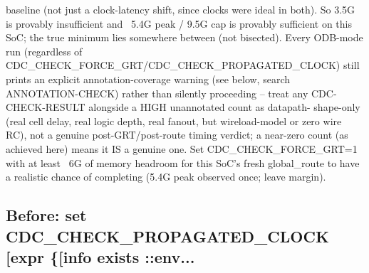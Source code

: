 \begin{record}
\begin{textblock}
baseline (not just a clock-latency shift, since clocks were ideal in
both). So 3.5G is provably insufficient and ~5.4G peak / 9.5G cap is
provably sufficient on this SoC; the true minimum lies somewhere
between (not bisected). Every ODB-mode run (regardless of
CDC_CHECK_FORCE_GRT/CDC_CHECK_PROPAGATED_CLOCK) still prints an
explicit annotation-coverage warning (see below, search
ANNOTATION-CHECK) rather than silently proceeding -- treat any
CDC-CHECK-RESULT alongside a HIGH unannotated count as datapath-
shape-only (real cell delay, real logic depth, real fanout, but
wireload-model or zero wire RC), not a genuine post-GRT/post-route
timing verdict; a near-zero count (as achieved here) means it IS a
genuine one. Set CDC_CHECK_FORCE_GRT=1 with at least ~6G of memory
headroom for this SoC's fresh global_route to have a realistic chance
of completing (5.4G peak observed once; leave margin).
\end{textblock}

\subsection*{Before: set CDC\_CHECK\_PROPAGATED\_CLOCK [expr \{[info exists ::env...}


\end{record}

